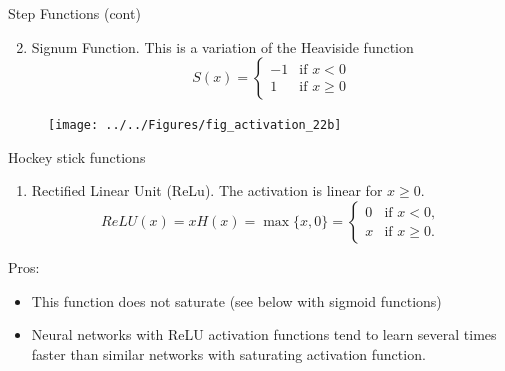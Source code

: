 \documentclass{beamer}
\begin{document}
\begin{frame}{Step Functions (cont)}
	\begin{enumerate}
		\setcounter{enumi}{1}
		\item Signum Function. This is a variation of the Heaviside function
		\begin{equation*}
			S(x)= \begin{cases}
				-1 & \text{if } x <0 \\
				1 & \text{if } x \ge 0
			\end{cases}
		\end{equation*}
	\end{enumerate}
\begin{figure}[h]
	\centering
	\texttt{[image: ../../Figures/fig\_activation\_22b]}
\end{figure}
\end{frame}

\begin{frame}{Hockey stick functions}
	\begin{enumerate}
		\item Rectified Linear Unit (ReLu). The activation is linear for $x\ge 0$.
		\begin{equation*}
			ReLU(x)= x H(x)= \max \{ x, 0\} = \begin{cases}
				0 & \text{if } x <0,\\
				x & \text{if } x \ge 0.
			\end{cases}
		\end{equation*}
	\end{enumerate}
Pros:
\begin{itemize}
	\item This function does not saturate (see below with sigmoid functions)
	\item Neural networks with ReLU activation functions tend to learn several times faster than similar networks with saturating activation function.
\end{itemize}

\end{frame}
\end{document}
